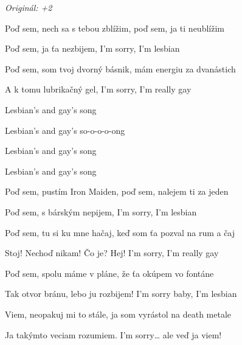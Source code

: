 \begin{song}


\begin{headerbox}
 \quad
\textit{Originál: +2}
\end{headerbox}

\begin{hchordbox}
\end{hchordbox}

\Large

\bigskip

 Poď sem, nech sa s tebou zblížim,  poď sem, ja ti neublížim \par
{} Poď sem, ja ťa nezbijem,  I'm sorry, I'm lesbian \par
{} Poď sem, som tvoj dvorný básnik,  mám energiu za dvanástich \par
{} A k tomu lubrikačný gel,  I'm sorry, I'm really gay \par

\bigskip

\begin{chorusbox}{\Refren}
Lesbian's and gay's song \par
{}Lesbian's and gay's so-o-o-o-ong \par
{}Lesbian's and gay's song \par
{}Lesbian's and gay's song \par
\end{chorusbox}

\bigskip

 Poď sem, pustím Iron Maiden,  poď sem, nalejem ti za jeden \par
{} Poď sem, s bárským nepijem,  I'm sorry, I'm lesbian \par
{} Poď sem, tu si ku mne hačaj,  keď som ťa pozval na rum a čaj \par
{} Stoj! Nechoď nikam! Čo je? Hej!  I'm sorry, I'm really gay \par

\bigskip

\Refren

\bigskip

 Poď sem, spolu máme v pláne,  že ťa okúpem vo fontáne \par
{} Tak otvor bránu, lebo ju rozbijem!  I'm sorry baby, I'm lesbian \par
{} Viem, neopakuj mi to stále,  ja som vyrástol na death metale \par
{} Ja takýmto veciam rozumiem.  I'm sorry… ale veď ja viem! \par

\bigskip

\Refren

\end{song}